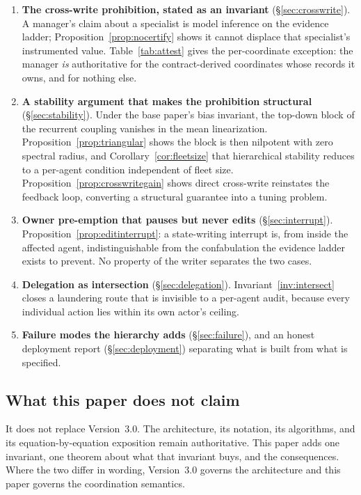 \documentclass[11pt]{article}
\begin{document}
\begin{enumerate}[leftmargin=1.8em,itemsep=3pt]
\item \textbf{The cross-write prohibition, stated as an invariant} (\S\ref{sec:crosswrite}). A manager's claim about a specialist is model inference on the evidence ladder; Proposition~\ref{prop:nocertify} shows it cannot displace that specialist's instrumented value. Table~\ref{tab:attest} gives the per-coordinate exception: the manager \emph{is} authoritative for the contract-derived coordinates whose records it owns, and for nothing else.
\item \textbf{A stability argument that makes the prohibition structural} (\S\ref{sec:stability}). Under the base paper's bias invariant, the top-down block of the recurrent coupling vanishes in the mean linearization. Proposition~\ref{prop:triangular} shows the block is then nilpotent with zero spectral radius, and Corollary~\ref{cor:fleetsize} that hierarchical stability reduces to a per-agent condition independent of fleet size. Proposition~\ref{prop:crosswritegain} shows direct cross-write reinstates the feedback loop, converting a structural guarantee into a tuning problem.
\item \textbf{Owner pre-emption that pauses but never edits} (\S\ref{sec:interrupt}). Proposition~\ref{prop:editinterrupt}: a state-writing interrupt is, from inside the affected agent, indistinguishable from the confabulation the evidence ladder exists to prevent. No property of the writer separates the two cases.
\item \textbf{Delegation as intersection} (\S\ref{sec:delegation}). Invariant~\ref{inv:intersect} closes a laundering route that is invisible to a per-agent audit, because every individual action lies within its own actor's ceiling.
\item \textbf{Failure modes the hierarchy adds} (\S\ref{sec:failure}), and an honest deployment report (\S\ref{sec:deployment}) separating what is built from what is specified.
\end{enumerate}

\subsection{What this paper does not claim}

It does not replace Version~3.0. The architecture, its notation, its algorithms, and its equation-by-equation exposition remain authoritative. This paper adds one invariant, one theorem about what that invariant buys, and the consequences. Where the two differ in wording, Version~3.0 governs the architecture and this paper governs the coordination semantics.
\end{document}
